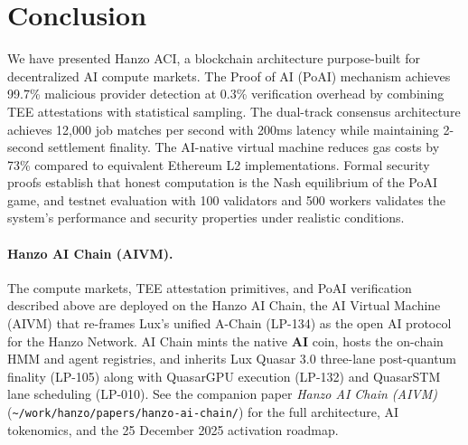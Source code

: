 \section{Conclusion}

\label{sec:conclusion}

We have presented Hanzo ACI, a blockchain architecture purpose-built for decentralized AI compute markets. The Proof of AI (PoAI) mechanism achieves 99.7\% malicious provider detection at 0.3\% verification overhead by combining TEE attestations with statistical sampling. The dual-track consensus architecture achieves 12,000 job matches per second with 200ms latency while maintaining 2-second settlement finality. The AI-native virtual machine reduces gas costs by 73\% compared to equivalent Ethereum L2 implementations. Formal security proofs establish that honest computation is the Nash equilibrium of the PoAI game, and testnet evaluation with 100 validators and 500 workers validates the system's performance and security properties under realistic conditions.

\paragraph{Hanzo AI Chain (AIVM).}
The compute markets, TEE attestation primitives, and PoAI verification described above are deployed on the Hanzo AI Chain, the AI Virtual Machine (AIVM) that re-frames Lux's unified A-Chain (LP-134) as the open AI protocol for the Hanzo Network. AI Chain mints the native \textbf{AI} coin, hosts the on-chain HMM and agent registries, and inherits Lux Quasar 3.0 three-lane post-quantum finality (LP-105) along with QuasarGPU execution (LP-132) and QuasarSTM lane scheduling (LP-010). See the companion paper \emph{Hanzo AI Chain (AIVM)} (\texttt{\textasciitilde/work/hanzo/papers/hanzo-ai-chain/}) for the full architecture, AI tokenomics, and the 25 December 2025 activation roadmap.

